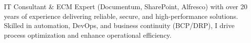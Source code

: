 \par{
IT Consultant \& ECM Expert (Documentum, SharePoint, Alfresco) with over 20 years of experience delivering reliable, secure, and high-performance solutions. Skilled in automation, DevOps, and business continuity (BCP/DRP), I drive process optimization and enhance operational efficiency.}
